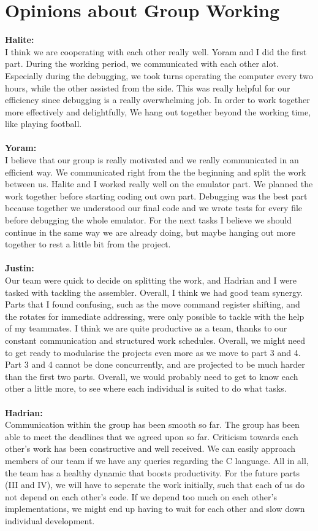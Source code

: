 \documentclass[a4paper]{article}
\begin{document}
\section{Opinions about Group Working}
\textbf{Halite:}\\
I think we are cooperating with each other really well. Yoram and I did the first part. During the working period, we communicated with each other alot. Especially during the debugging, we took turns operating the computer every two hours, while the other assisted from the side. This was really helpful for our efficiency since debugging is a really overwhelming job. In order to work together more effectively and delightfully, We hang out together beyond the working time, like playing football.\\
\\
\textbf{Yoram:}\\
I believe that our group is really motivated and we really communicated in an efficient way. We communicated right from the the beginning and split the work between us.
Halite and I worked really well on the emulator part. We planned the work together before starting coding out own part. Debugging was the best part because together we understood our final code and we wrote tests for every file before debugging the whole emulator. For the next tasks I believe we should continue in the same way we are already doing, but maybe hanging out more together to rest a little bit from the project.
\\\\
\textbf{Justin:}\\
Our team were quick to decide on splitting the work, and Hadrian and I were tasked with tackling the assembler. Overall, I think we had good team synergy. Parts that I found confusing, such as the move command register shifting, and the rotates for immediate addressing, were only possible to tackle with the help of my teammates. I think we are quite productive as a team, thanks to our constant communication and structured work schedules. Overall, we might need to get ready to modularise the projects even more as we move to part 3 and 4. Part 3 and 4 cannot be done concurrently, and are projected to be much harder than the first two parts. Overall, we would probably need to get to know each other a little more, to see where each individual is suited to do what tasks.\\
\\
\textbf{Hadrian:}\\
Communication within the group has been smooth so far. The group has been able to meet the deadlines that we agreed upon so far. Criticism towards each other's work has been constructive and well received. We can easily approach members of our team if we have any queries regarding the C language. All in all, the team has a healthy dynamic that boosts productivity. For the future parts (III and IV), we will have to seperate the work initially, such that each of us do not depend on each other's code. If we depend too much on each other's implementations, we might end up having to wait for each other and slow down individual development.
\end{document}
